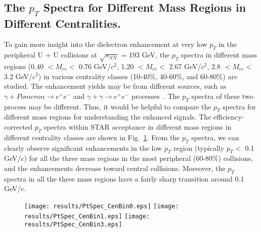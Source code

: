 \subsection{The $p_{T}$ Spectra for Different Mass Regions in Different Centralities.}
To gain more insight into the dielectron enhancement at very low $p_{T}$ in the peripheral U + U collisions at $\sqrt{s_{NN}}$ = 193 GeV, the $p_{T}$ spectra in different mass regions (0.40 $<M_{ee}<$ 0.76 GeV/$c^{2}$, 1.20 $<M_{ee}<$ 2.67 GeV/$c^{2}$, 2.8 $<M_{ee}<$ 3.2 GeV/$c^{2}$) in various centrality classes (10-40\%, 40-60\%, and 60-80\%) are studied. The enhancement yields may be from different sources, such as $\gamma + Pomeron \rightarrow e^{+}e^{-}$ and $\gamma + \gamma \rightarrow e^{+}e^{-}$ processes~\cite{STARUPCrho0, PHENIXUPCjpsi}. The $p_{T}$ spectra of these two process may be different. Thus, it would be helpful to compare the $p_{T}$ spectra for different mass regions for understanding the enhanced signals. The efficiency-corrected $p_{T}$ spectra within STAR acceptance in different mass regions in different centrality classes are shown in Fig.~\ref{ptspec:4diffcens}. From the $p_{T}$ spectra, we can clearly observe significant enhancements in the low $p_{T}$ region (typically $p_{T}<$ 0.1 GeV/$c$) for all the three mass regions in the most peripheral (60-80\%) collisions, and the enhancements decrease toward central collisions. Moreover, the $p_{T}$ spectra in all the three mass regions have a fairly sharp transition around 0.1 GeV/$c$.

\begin{figure}[htbp]
\centering
\texttt{[image: results/PtSpec\_CenBin0.eps]}
\texttt{[image: results/PtSpec\_CenBin1.eps]}
\texttt{[image: results/PtSpec\_CenBin3.eps]}
\label{ptspec:4diffcens}
\end{figure}
